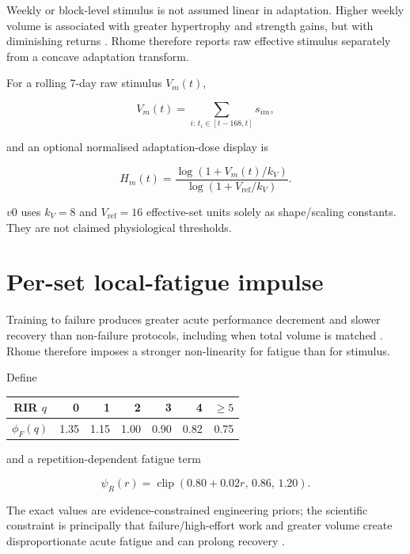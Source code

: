 \documentclass[11pt]{article}
\begin{document}
Weekly or block-level stimulus is not assumed linear in adaptation. Higher weekly volume is associated with greater hypertrophy and strength gains, but with diminishing returns \cite{pelland2026}. Rhome therefore reports raw effective stimulus separately from a concave adaptation transform.

For a rolling 7-day raw stimulus $V_m(t)$,

\begin{equation}
V_m(t)=\sum_{i:\,t_i\in[t-168,t]}s_{im},
\end{equation}

and an optional normalised adaptation-dose display is

\begin{equation}
H_m(t)=\frac{\log(1+V_m(t)/k_V)}{\log(1+V_{\mathrm{ref}}/k_V)}.
\end{equation}

$v0$ uses $k_V=8$ and $V_{\mathrm{ref}}=16$ effective-set units solely as shape/scaling constants. They are not claimed physiological thresholds.

\section{Per-set local-fatigue impulse}

Training to failure produces greater acute performance decrement and slower recovery than non-failure protocols, including when total volume is matched \cite{moran2017}. Rhome therefore imposes a stronger non-linearity for fatigue than for stimulus.

Define

\begin{center}
\begin{tabular}{c|rrrrrr}
RIR $q$ & 0 & 1 & 2 & 3 & 4 & $\ge5$ \\
\hline
$\phi_F(q)$ & 1.35 & 1.15 & 1.00 & 0.90 & 0.82 & 0.75
\end{tabular}
\end{center}

and a repetition-dependent fatigue term

\begin{equation}
\psi_R(r)=\operatorname{clip}(0.80+0.02r,\,0.86,\,1.20).
\end{equation}

The exact values are evidence-constrained engineering priors; the scientific constraint is principally that failure/high-effort work and greater volume create disproportionate acute fatigue and can prolong recovery \cite{moran2017}.
\end{document}
